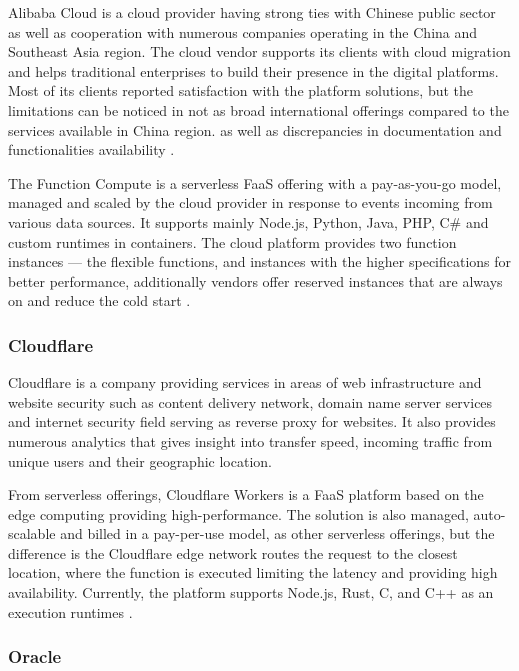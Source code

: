 Alibaba Cloud is a cloud provider having strong ties with Chinese public sector as well as cooperation with numerous companies operating in the China and Southeast Asia region. The cloud vendor supports its clients with cloud migration and helps traditional enterprises to build their presence in the digital platforms. Most of its clients reported satisfaction with the platform solutions, but the limitations can be noticed in not as broad international offerings compared to the services available in China region. as well as discrepancies in documentation and functionalities availability \cite{Gartner}.

The Function Compute is a serverless FaaS offering with a pay-as-you-go model, managed and scaled by the cloud provider in response to events incoming from various data sources. It supports mainly Node.js, Python, Java, PHP, C\# and custom runtimes in containers. The cloud platform provides two function instances --- the flexible functions, and instances with the higher specifications for better performance, additionally vendors offer reserved instances that are always on and reduce the cold start \cite{AlibabaFunctionCompute}.

\subsubsection*{Cloudflare}

Cloudflare is a company providing services in areas of web infrastructure and website security such as content delivery network, domain name server services and internet security field serving as reverse proxy for websites. It also provides numerous analytics that gives insight into transfer speed, incoming traffic from unique users and their geographic location.

From serverless offerings, Cloudflare Workers is a FaaS platform based on the edge computing providing high-performance. The solution is also managed, auto-scalable and billed in a pay-per-use model, as other serverless offerings, but the difference is the Cloudflare edge network routes the request to the closest location, where the function is executed limiting the latency and providing high availability. Currently, the platform supports Node.js, Rust, C, and C++ as an execution runtimes \cite{CloudflareWorkers}.

\subsubsection*{Oracle}

